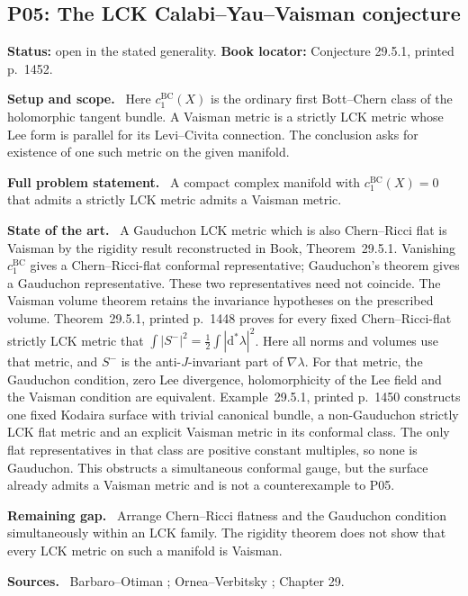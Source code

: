 \documentclass[11pt]{article}
\newcommand{\field}[1]{\par\medskip\noindent\textbf{#1.}\ }
\begin{document}
\subsection{P05: The LCK Calabi--Yau--Vaisman conjecture}
\label{P05}
\noindent\textbf{Status:} open in the stated generality. \textbf{Book locator:} Conjecture 29.5.1, printed p.~1452.
\field{Setup and scope} Here $c_1^{\mathrm{BC}}(X)$ is the ordinary first Bott--Chern class of the holomorphic tangent bundle. A Vaisman metric is a strictly LCK metric whose Lee form is parallel for its Levi--Civita connection. The conclusion asks for existence of one such metric on the given manifold.
\field{Full problem statement} A compact complex manifold with $c_1^{\mathrm{BC}}(X)=0$ that admits a strictly LCK metric admits a Vaisman metric.
\field{State of the art} A Gauduchon LCK metric which is also Chern--Ricci flat is Vaisman by the rigidity result reconstructed in Book, Theorem~29.5.1. Vanishing $c_1^{\mathrm{BC}}$ gives a Chern--Ricci-flat conformal representative; Gauduchon's theorem gives a Gauduchon representative. These two representatives need not coincide. The Vaisman volume theorem retains the invariance hypotheses on the prescribed volume. Theorem~29.5.1, printed p.~1448 proves for every fixed Chern--Ricci-flat strictly LCK metric that $\int|S^-|^2=\frac12\int|\mathrm d^*\lambda|^2$. Here all norms and volumes use that metric, and $S^-$ is the anti-$J$-invariant part of $\nabla\lambda$. For that metric, the Gauduchon condition, zero Lee divergence, holomorphicity of the Lee field and the Vaisman condition are equivalent. Example~29.5.1, printed p.~1450 constructs one fixed Kodaira surface with trivial canonical bundle, a non-Gauduchon strictly LCK flat metric and an explicit Vaisman metric in its conformal class. The only flat representatives in that class are positive constant multiples, so none is Gauduchon. This obstructs a simultaneous conformal gauge, but the surface already admits a Vaisman metric and is not a counterexample to P05.
\field{Remaining gap} Arrange Chern--Ricci flatness and the Gauduchon condition simultaneously within an LCK family. The rigidity theorem does not show that every LCK metric on such a manifold is Vaisman.
\field{Sources} Barbaro--Otiman \cite[Introduction and Section 4]{BO25LCK}; Ornea--Verbitsky \cite{OV24Vaisman}; Chapter 29.
\end{document}
